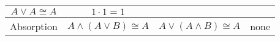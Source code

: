 \begin{tabular}{c|c|c|c}
\begin{minipage}{.25\textwidth} \centerline{$A \lor A \cong A$} \end{minipage} & 
\begin{minipage}{.25\textwidth} \centerline{$ 1 \cdot 1 = 1$} \end{minipage} \\ \hline
\begin{minipage}{.25\textwidth} \rule{0pt}{22pt}\index{absorption}Absorption\rule[-10pt]{0pt}{10pt} \end{minipage} & 
\begin{minipage}{.25\textwidth} \centerline{$A \land (A \lor B) \cong A$} \end{minipage} & 
\begin{minipage}{.25\textwidth} \centerline{$A \lor (A \land B) \cong A$} \end{minipage} & none \\ 
\end{tabular} 